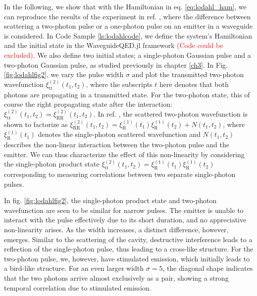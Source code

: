 In the following, we show that with the Hamiltonian in eq. \eqref{eq:lodahl_ham}, we can reproduce the results of the experiment in ref. \cite{LeJeannic2022DynamicalEmitter}, where the difference between scattering a two-photon pulse or a one-photon pulse on an emitter in a waveguide is considered. In Code Sample \ref{ls:lodahlcode}, we define the system's Hamiltonian and the initial state in the WaveguideQED.jl framework \textcolor{red}{(Code could be excluded)}. We also define two initial states; a single-photon Gaussian pulse and a two-photon Gaussian pulse, as studied previously in chapter \ref{ch3}. In Fig. \ref{fig:lodahlfig2}, we vary the pulse width $\sigma$ and plot the transmitted two-photon wavefunction $\xi_{\mathrm{tt}}^{(2)}(t_1,t_2)$, where the subscripts $t$ here denotes that both photons are propagating in a transmitted state. For the two-photon state, this of course the right propagating state after the interaction: $\xi_{\mathrm{tt}}^{(2)}(t_1,t_2) = \xi_{\mathrm{RR}}^{(2)}(t_1,t_2)$. In ref. \cite{LeJeannic2022DynamicalEmitter}, the scattered two-photon wavefunction is shown to factorize as $\xi_{\mathrm{RR}}^{(2)}(t_1,t_2) = \xi_\mathrm{R}^{(1)}(t_1)\xi_\mathrm{R}^{(1)}(t_2) + N(t_1,t_2)$, where $\xi_\mathrm{R}^{(1)}(t_1)$ denotes the single-photon scattered wavefunction and $N(t_1,t_2)$ describes the non-linear interaction between the two-photon pulse and the emitter. We can thus characterize the effect of this non-linearity by considering the single-photon product state 
 $\xi_{\mathrm{tt}}^{(2)}(t_1,t_2) = \xi_\mathrm{R}^{(1)}(t_1)\xi_\mathrm{R}^{(1)}(t_2)$ corresponding to measuring correlations between two separate single-photon pulses. 



In fig. \ref{fig:lodahlfig2}, the single-photon product state and two-photon wavefunction are seen to be similar for narrow pulses. The emitter is unable to interact with the pulse effectively due to its short duration, and no appreciative non-linearity arises. As the width increases, a distinct difference, however, emerges. Similar to the scattering of the cavity, destructive interference leads to a reflection of the single-photon pulse, thus leading to a cross-like structure. For the two-photon pulse, we, however, have stimulated emission, which initially leads to a bird-like structure. For an even larger width $\sigma = 5$, the diagonal shape indicates that the two photons arrive almost exclusively as a pair, showing a strong temporal correlation due to stimulated emission. 

